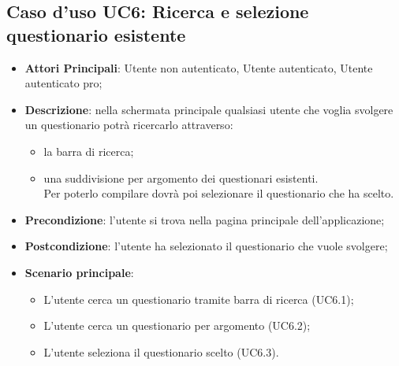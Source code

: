 \subsection{Caso d'uso UC6: Ricerca e selezione questionario esistente}
\begin{itemize}
\item\textbf{Attori Principali}: Utente non autenticato, Utente autenticato, Utente autenticato pro;
\item\textbf{Descrizione}: nella schermata principale qualsiasi utente che voglia svolgere un questionario potrà ricercarlo attraverso:
\begin{itemize}
\item la barra di ricerca;
\item una suddivisione per argomento dei questionari esistenti.
\\Per poterlo compilare dovrà poi selezionare il questionario che ha scelto.
\end{itemize}	
\item\textbf{Precondizione}: l'utente si trova nella pagina principale dell'applicazione;
\item\textbf{Postcondizione}: l'utente ha selezionato il questionario che vuole svolgere;
\item\textbf{Scenario principale}:
\begin{itemize}
\item L'utente cerca un questionario tramite barra di ricerca (UC6.1);
\item L'utente cerca un questionario per argomento (UC6.2);
\item L'utente seleziona il questionario scelto (UC6.3).
\end{itemize}
\end{itemize}

